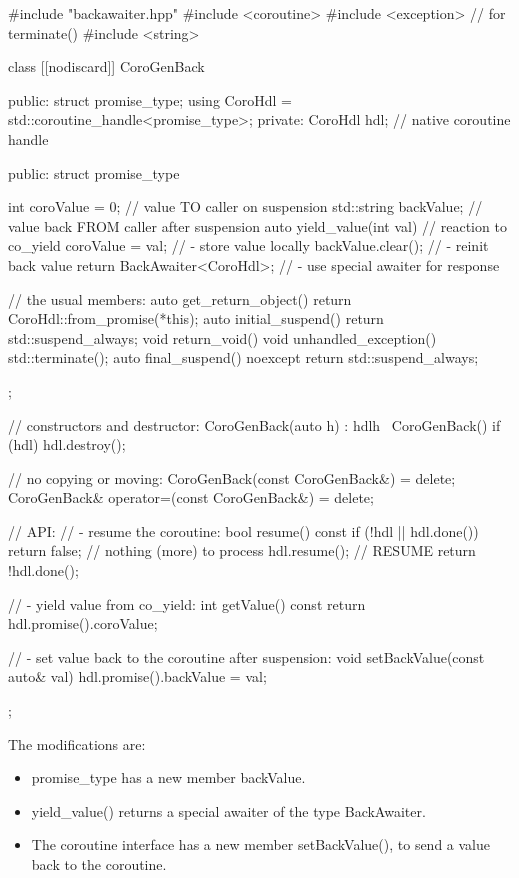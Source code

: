 \begin{cpp}
#include "backawaiter.hpp"
#include <coroutine>
#include <exception> // for terminate()
#include <string>

class [[nodiscard]] CoroGenBack {
public:
	struct promise_type;
	using CoroHdl = std::coroutine_handle<promise_type>;
private:
	CoroHdl hdl; // native coroutine handle
	
public:
	struct promise_type {
		int coroValue = 0; // value TO caller on suspension
		std::string backValue; // value back FROM caller after suspension
		auto yield_value(int val) { // reaction to co_yield
			coroValue = val; // - store value locally
			backValue.clear(); // - reinit back value
			return BackAwaiter<CoroHdl>{}; // - use special awaiter for response
		}
		
		// the usual members:
		auto get_return_object() { return CoroHdl::from_promise(*this); }
		auto initial_suspend() { return std::suspend_always{}; }
		void return_void() { }
		void unhandled_exception() { std::terminate(); }
		auto final_suspend() noexcept { return std::suspend_always{}; }
	};
	
	// constructors and destructor:
	CoroGenBack(auto h) : hdl{h} { }
	~CoroGenBack() { if (hdl) hdl.destroy(); }
	
	// no copying or moving:
	CoroGenBack(const CoroGenBack&) = delete;
	CoroGenBack& operator=(const CoroGenBack&) = delete;
	
	// API:
	// - resume the coroutine:
	bool resume() const {
	if (!hdl || hdl.done()) {
		return false; // nothing (more) to process
	}
	hdl.resume(); // RESUME
	return !hdl.done();
	}
	
	// - yield value from co_yield:
	int getValue() const {
		return hdl.promise().coroValue;
	}
	
	// - set value back to the coroutine after suspension:
	void setBackValue(const auto& val) {
		hdl.promise().backValue = val;
	}
};
\end{cpp}

The modifications are:

\begin{itemize}
\item 
promise\_type has a new member backValue.

\item 
yield\_value() returns a special awaiter of the type BackAwaiter.

\item 
The coroutine interface has a new member setBackValue(), to send a value back to the coroutine.
\end{itemize}

